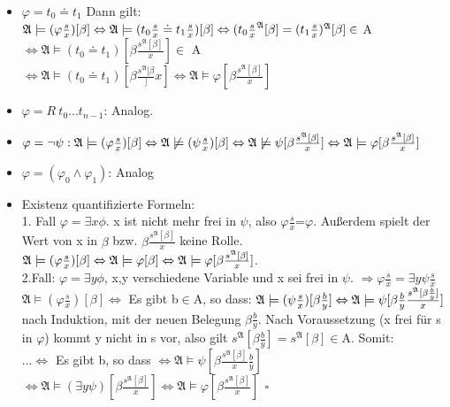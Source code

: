 \documentclass[a4paper]{scrartcl}
\begin{document}
\begin{itemize}
\item $\varphi = t_0\doteq t_1$ Dann gilt:\\
$\mathfrak{A}\models(\varphi \frac{s}{x})[\beta] \Leftrightarrow \mathfrak{A}\models(t_0\frac{s}{x}\doteq t_1 \frac{s}{x})[\beta]\\
\Leftrightarrow(t_0\frac{s}{x}^\mathfrak{A} [\beta]=(t_1\frac{s}{x})^\mathfrak{A}[\beta]\in$ A\\
$\Leftrightarrow \mathfrak{A}\models(t_0 \doteq t_1)[\beta \frac{s^\mathfrak{A}[\beta]}{x}]\in $ A\\
$\Leftrightarrow \mathfrak{A}\models (t_0 \doteq t_1) [\beta \frac{s^\mathfrak{A}[\beta}]{x}]\Leftrightarrow \mathfrak{A}\models \varphi[\beta \frac{s^\mathfrak{A}[\beta]}{x}]$
\item $\varphi=R~t_0...t_{n-1}$: Analog.
\item $\varphi = \neg \psi: \mathfrak{A} \models (\varphi \frac{s}{x}) [\beta]\\
\Leftrightarrow \mathfrak{A}\not\models (\psi \frac{s}{x})[\beta]\\
\Leftrightarrow \mathfrak{A} \not\models \psi [\beta \frac{s^\mathfrak{A}[\beta]}{x}]\\
\Leftrightarrow \mathfrak{A} \models \varphi [\beta \frac{s^\mathfrak{A}[\beta]}{x}]$
\item $\varphi=(\varphi_0\land \varphi_1)$: Analog
\item Existenz quantifizierte Formeln:\\
1. Fall $\varphi = \exists x\phi$. x ist nicht mehr frei in $\psi$, also $\varphi \frac{s}{x}$=$\varphi$. Außerdem spielt der Wert von x in $\beta$ bzw. $\beta \frac{s^\mathfrak{A}[\beta]}{x}$ keine Rolle.\\
$\mathfrak{A}\models (\varphi \frac{s}{x})[\beta] \Leftrightarrow \mathfrak{A} \models \varphi [\beta]\\
\Leftrightarrow \mathfrak{A}\models \varphi [\beta \frac{s^\mathfrak{A}[\beta]}{x}]$.\\
2.Fall: $\varphi = \exists y\phi$, x,y verschiedene Variable und x sei frei in $\psi$. $\Rightarrow \varphi\frac{s}{x}=\exists y\psi \frac{s}{x}$\\
$\mathfrak{A} \models (\varphi\frac{s}{x})[\beta]\Leftrightarrow$ Es gibt b$\in$A, so dass: $\mathfrak{A}\models (\psi\frac{s}{x})[\beta\frac{b}{y}]\\
\Leftrightarrow \mathfrak{A}\models \psi [\beta\frac{b}{y}\frac{s^\mathfrak{A}[\beta\frac{b}{y}]}{x}]$ nach Induktion, mit der neuen Belegung $\beta \frac{b}{y}$. Nach Voraussetzung (x frei für s in $\varphi$) kommt y nicht in s vor, also gilt $s^\mathfrak{A}[\beta\frac{b}{y}]=s^\mathfrak{A}[\beta]\in $A. Somit:\\
...$\Leftrightarrow$ Es gibt b, so dass $\Leftrightarrow \mathfrak{A}\models \psi[\beta\frac{s^\mathfrak{A}[\beta]}{x}\frac{b}{y}]$\\
$\Leftrightarrow \mathfrak{A}\models(\exists y\psi)[\beta\frac{s^\mathfrak{A}[\beta]}{x}]\Leftrightarrow \mathfrak{A} \models \varphi[\beta \frac{s^\mathfrak{A}[\beta]}{x}]~~\square$
\end{itemize}
\end{document}

